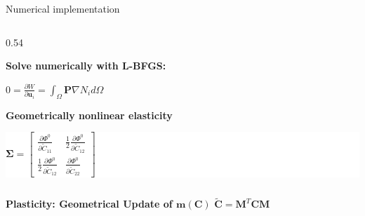 \documentclass[10pt, aspectratio=169]{beamer}
\begin{document}
\begin{frame}{Numerical implementation}
\begin{columns}[c, onlytextwidth]
\begin{column}{0.54\textwidth}
\begin{flushleft}
                \vspace{0.3cm}
                \textbf{\color{red!80!black} Solve numerically with L-BFGS:} \\
                \vspace{0.05cm}
                \colorbox{gray!20}{
                    \begin{minipage}{\dimexpr\textwidth-12pt\relax}
                        \centering \rule[-0.2cm]{0pt}{0.7cm}
                        $\displaystyle 0 = \frac{\partial W}{\partial \mathbf{u}_i} = \int_{\Omega} \mathbf{P} \nabla N_i d\Omega$
                    \end{minipage}
                }

                \vspace{0.3cm}
                \textbf{\color{red!80!black} Geometrically nonlinear elasticity} \\
                \vspace{0.05cm}
                \colorbox{gray!20}{
                    \centering
                    \colorbox{white}{
                        \rule[-0.4cm]{0pt}{1.0cm}
                        $\displaystyle \boldsymbol{\Sigma} = \left[ \begin{matrix}
                            \frac{\partial \Phi^0}{\partial \tilde{C}_{11}} & \frac{1}{2} \frac{\partial \Phi^0}{\partial \tilde{C}_{12}} \\[0.15cm]
                            \frac{1}{2} \frac{\partial \Phi^0}{\partial \tilde{C}_{12}} & \frac{\partial \Phi^0}{\partial \tilde{C}_{22}}
                        \end{matrix} \right]$
                    }
                }

            \end{flushleft}
        \end{column}
    \end{columns}

    \vspace{0.3cm}
    \begin{center}
        \colorbox{SecondaryTitle!15}{
            \rule[-0.2cm]{0pt}{0.6cm}\hspace{0.3cm}
            \Large \textbf{\color{SecondaryTitle} Plasticity: Geometrical Update of $\mathbf{m}(\mathbf{C})$}
            \quad $\tilde{\mathbf{C}} = \mathbf{M}^T \mathbf{C} \mathbf{M}$
            \hspace{0.3cm}\rule[-0.2cm]{0pt}{0.6cm}
        }
    \end{center}
\end{frame}
\end{document}
